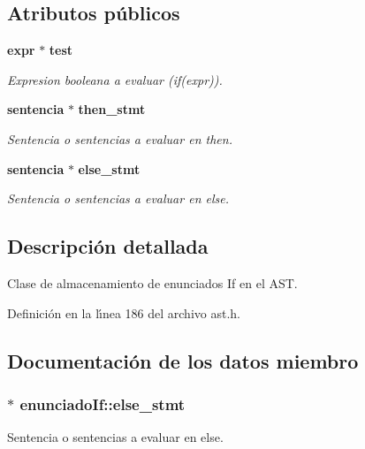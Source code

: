 \subsection*{Atributos p\'{u}blicos}
\begin{CompactItemize}
\item 
{\bf expr} $\ast$ {\bf test}
\begin{CompactList}\small\item\em Expresion booleana a evaluar (if(expr)). \item\end{CompactList}\item 
{\bf sentencia} $\ast$ {\bf then\_\-stmt}
\begin{CompactList}\small\item\em Sentencia o sentencias a evaluar en then. \item\end{CompactList}\item 
{\bf sentencia} $\ast$ {\bf else\_\-stmt}
\begin{CompactList}\small\item\em Sentencia o sentencias a evaluar en else. \item\end{CompactList}\end{CompactItemize}


\subsection{Descripci\'{o}n detallada}
Clase de almacenamiento de enunciados If en el AST. 



Definici\'{o}n en la l\'{\i}nea 186 del archivo ast.h.

\subsection{Documentaci\'{o}n de los datos miembro}
\subsubsection{$\ast$ {\bf enunciado\-If::else\_\-stmt}}\label{structenunciadoIf_o2}


Sentencia o sentencias a evaluar en else. 



